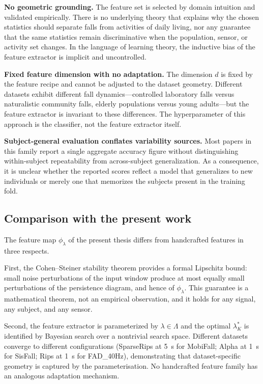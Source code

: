 \textbf{No geometric grounding.}  The feature set is selected by domain intuition
and validated empirically.  There is no underlying theory that explains why the
chosen statistics should separate falls from activities of daily living, nor any
guarantee that the same statistics remain discriminative when the population,
sensor, or activity set changes.  In the language of learning theory, the
inductive bias of the feature extractor is implicit and uncontrolled.

\textbf{Fixed feature dimension with no adaptation.}  The dimension $d$ is fixed by
the feature recipe and cannot be adjusted to the dataset geometry.  Different
datasets exhibit different fall dynamics---controlled laboratory falls versus
naturalistic community falls, elderly populations versus young adults---but the
feature extractor is invariant to these differences.  The hyperparameter of this
approach is the classifier, not the feature extractor itself.

\textbf{Subject-general evaluation conflates variability sources.}  Most papers in
this family report a single aggregate accuracy figure without distinguishing
within-subject repeatability from across-subject generalization.  As a consequence,
it is unclear whether the reported scores reflect a model that generalizes to new
individuals or merely one that memorizes the subjects present in the training fold.

\subsection{Comparison with the present work}

The feature map $\phi_\lambda$ of the present thesis differs from handcrafted
features in three respects.

First, the Cohen--Steiner stability theorem provides a formal Lipschitz bound:
small noise perturbations of the input window produce at most equally small
perturbations of the persistence diagram, and hence of $\phi_\lambda$.  This
guarantee is a mathematical theorem, not an empirical observation, and it holds
for any signal, any subject, and any sensor.

Second, the feature extractor is parameterized by $\lambda\in\Lambda$ and the
optimal $\lambda^*_K$ is identified by Bayesian search over a nontrivial search
space.  Different datasets converge to different configurations (SparseRips at 5~s
for MobiFall; Alpha at 1~s for SisFall; Rips at 1~s for FAD\_40Hz), demonstrating
that dataset-specific geometry is captured by the parameterisation.  No handcrafted
feature family has an analogous adaptation mechanism.


